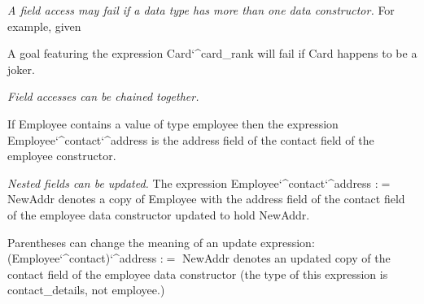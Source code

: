 \documentclass[a4paper,11pt,notitlepage,onecolumn]{book}
\begin{document}
\emph{A field access may fail if a data type has more than one data
constructor.}  For example, given
\begin{small}

\begin{ptabular}
\nextline
\end{ptabular}

\end{small}
A goal featuring the expression \textsf{Card\char`\^{}card\_rank} will fail if \textsf{Card} happens
to be a \textsf{joker}.

\emph{Field accesses can be chained together.}
\begin{small}

\begin{ptabular}
\nextline
{}
\nextline
\end{ptabular}

\end{small}
If \textsf{Employee} contains a value of type \textsf{employee} then the expression
\textsf{Employee\char`\^{}contact\char`\^{}address} is the \textsf{address} field of the \textsf{contact}
field of the \textsf{employee} constructor.

\emph{Nested fields can be updated.}
The expression \textsf{Employee\char`\^{}contact\char`\^{}address :{\ensuremath{=}} NewAddr} denotes a copy of
\textsf{Employee} with the \textsf{address} field of the \textsf{contact} field of the \textsf{employee}
data constructor updated to hold \textsf{NewAddr}.

Parentheses can change the meaning of an update expression:\\
\textsf{(Employee\char`\^{}contact)\char`\^{}address :{\ensuremath{=}} NewAddr} denotes an updated copy of the
\textsf{contact} field of the \textsf{employee} data constructor (\ie the type of this
expression is \textsf{contact\_details}, not \textsf{employee}.)
\end{document}
